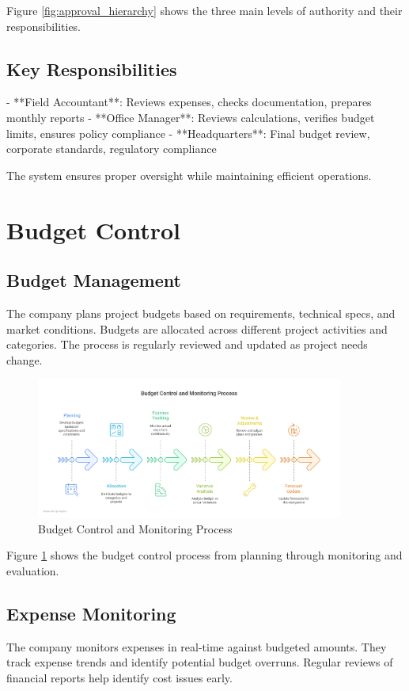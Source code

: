 Figure \ref{fig:approval_hierarchy} shows the three main levels of authority and their responsibilities.

\subsection{Key Responsibilities}
- **Field Accountant**: Reviews expenses, checks documentation, prepares monthly reports
- **Office Manager**: Reviews calculations, verifies budget limits, ensures policy compliance
- **Headquarters**: Final budget review, corporate standards, regulatory compliance

The system ensures proper oversight while maintaining efficient operations.

\section{Budget Control}

\subsection{Budget Management}
The company plans project budgets based on requirements, technical specs, and market conditions. Budgets are allocated across different project activities and categories. The process is regularly reviewed and updated as project needs change.

\begin{figure}[H]
    \centering
    \includegraphics[width=0.9\textwidth]{assets/images/budget_control.png}
    \caption{Budget Control and Monitoring Process}
    \label{fig:budget_control}
\end{figure}

Figure \ref{fig:budget_control} shows the budget control process from planning through monitoring and evaluation.

\subsection{Expense Monitoring}
The company monitors expenses in real-time against budgeted amounts. They track expense trends and identify potential budget overruns. Regular reviews of financial reports help identify cost issues early.

